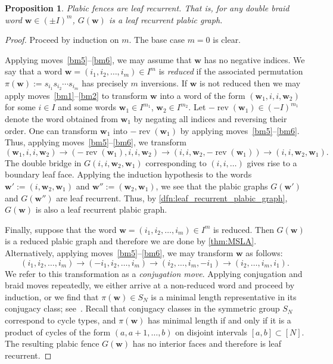 \documentclass[11pt]{article}
\newtheorem{proposition}[theo]{Proposition}
\theoremstyle{definition}
\numberwithin{equation}{section}
\newcommand\bw{{\mathbf{w}}}
\newcommand\Sn{S_\n}
\newcommand\pmn{\pm I}
\newcommand\DRW{(\pmn)^m}
\newcommand\Gbw{G(\bw)}
\def\GX(#1){G(#1)}
\newcommand\rev{\operatorname{rev}}
\newcommand\n{N}
\begin{document}
\begin{proposition}
Plabic fences are leaf recurrent. That is, for any double braid word $\bw\in\DRW$, $\Gbw$ is a leaf recurrent plabic graph.
\end{proposition}
\begin{proof}
Proceed by induction on $m$. The base case $m=0$ is clear.

Applying moves~\ref{bm5}--\ref{bm6}, we may assume that $\bw$ has no negative indices. We say that a word $\bw=(i_1,i_2,\dots,i_m)\in I^m$ is \emph{reduced} if the associated permutation $\pi(\bw):=s_{i_1}s_{i_2}\cdots s_{i_m}$ has precisely $m$ inversions. If $\bw$ is not reduced then we may apply moves~\ref{bm1}--\ref{bm2} to transform $\bw$ into a word of the form $(\bw_1,i,i,\bw_2)$ for some $i\in I$ and some words $\bw_1\in I^{m_1}$, $\bw_2\in I^{m_2}$. Let $-\rev(\bw_1)\in (-I)^{m_1}$ denote the word obtained from $\bw_1$ by negating all indices and reversing their order. One can transform $\bw_1$ into $-\rev(\bw_1)$ by applying moves~\ref{bm5}--\ref{bm6}. Thus, applying moves~\ref{bm5}--\ref{bm6}, we transform
\begin{equation*}%
  (\bw_1,i,i,\bw_2)\to (-\rev(\bw_1),i,i,\bw_2)\to (i,i,\bw_2,-\rev(\bw_1)) \to (i,i,\bw_2,\bw_1).
\end{equation*}  The double bridge in $\GX(i,i,\bw_2,\bw_1)$ corresponding to $(i,i,\dots)$ gives rise to a boundary leaf face. Applying the induction hypothesis to the words $\bw':=(i,\bw_2,\bw_1)$ and $\bw'':=(\bw_2,\bw_1)$, we see that the plabic graphs $\GX(\bw')$ and $\GX(\bw'')$ are leaf recurrent. Thus, by \cref{dfn:leaf_recurrent_plabic_graph}, $\GX(\bw)$ is also a leaf recurrent plabic graph.

Finally, suppose that the word $\bw=(i_1,i_2,\dots,i_m)\in I^m$ is reduced. Then $\Gbw$ is a reduced plabic graph and therefore we are done by \cref{thm:MSLA}. Alternatively, applying moves~\ref{bm5}--\ref{bm6}, we may transform $\bw$ as follows:
\begin{equation*}%
  (i_1,i_2,\dots,i_m) \to (-i_1,i_2,\dots,i_m) \to (i_2,\dots,i_m,-i_1)\to (i_2,\dots,i_m,i_1).
\end{equation*}
We refer to this transformation as a \emph{conjugation move}. Applying conjugation and braid moves repeatedly, we either arrive at a non-reduced word and proceed by induction, or we find that $\pi(\bw)\in\Sn$ is a minimal length representative in its conjugacy class; see~\cite[Theorem~1.1]{GePf}. Recall that conjugacy classes in the symmetric group $\Sn$ correspond to cycle types, and $\pi(\bw)$ has minimal length  if and only if it is a product of cycles of the form $(a,a+1,\dots,b)$ on disjoint intervals $[a,b]\subset[\n]$. The resulting plabic fence $\Gbw$ has no interior faces and therefore is leaf recurrent.
\end{proof}
\end{document}
